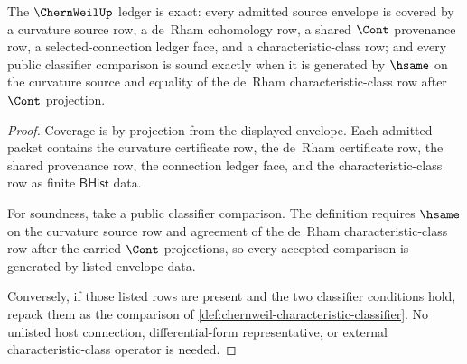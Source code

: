 \begin{theorem}
\label{thm:chernweil-characteristic-ledger-exactness}
The $\ChernWeilUp$ ledger is exact: every admitted source envelope is covered by a curvature source row, a de~Rham cohomology row, a shared $\Cont$ provenance row, a selected-connection ledger face, and a characteristic-class row; and every public classifier comparison is sound exactly when it is generated by $\hsame$ on the curvature source and equality of the de~Rham characteristic-class row after $\Cont$ projection.
\end{theorem}
\begin{proof}
Coverage is by projection from the displayed envelope. Each admitted packet contains the curvature certificate row, the de~Rham certificate row, the shared provenance row, the connection ledger face, and the characteristic-class row as finite $\mathsf{BHist}$ data.

For soundness, take a public classifier comparison. The definition requires $\hsame$ on the curvature source row and agreement of the de~Rham characteristic-class row after the carried $\Cont$ projections, so every accepted comparison is generated by listed envelope data.

Conversely, if those listed rows are present and the two classifier conditions hold, repack them as the comparison of \autoref{def:chernweil-characteristic-classifier}. No unlisted host connection, differential-form representative, or external characteristic-class operator is needed.
\end{proof}

